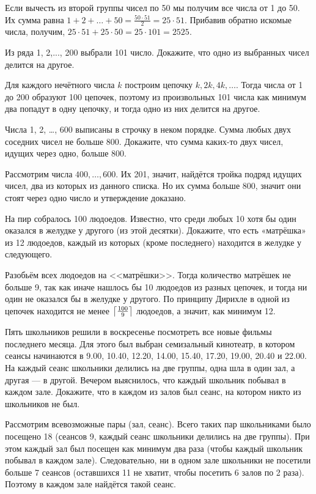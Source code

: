 \documentclass[12pt,a4paper]{article}
\begin{document}
 Если вычесть из второй группы чисел по 50 мы получим все числа от 1 до 50. Их сумма равна $1+2+\ldots+50=\frac{50\cdot 51}{2} = 25 \cdot 51$. Прибавив обратно искомые числа, получим, $25 \cdot 51+ 25\cdot 50 = 25 \cdot 101 = 2525$.


  Из ряда 1, 2,..., 200 выбрали 101 число. Докажите, что одно из выбранных чисел делится на другое.

 Для каждого нечётного числа $k$ построим цепочку $k, 2k, 4k, \ldots$. Тогда числа от 1 до 200 образуют 100 цепочек, поэтому из произвольных 101 числа как минимум два попадут в одну цепочку, и тогда одно из них делится на другое.

  Числа 1, 2, \ldots, 600 выписаны в строчку в неком порядке. Сумма любых двух соседних чисел не больше 800. Докажите, что сумма каких-то двух чисел, идущих через одно, больше 800.

 Рассмотрим числа $400, \ldots,600$. Их 201, значит, найдётся тройка подряд идущих чисел, два из которых из данного списка. Но их сумма больше 800, значит они стоят через одно число и утверждение доказано.


 На пир собралось 100 людоедов. Известно, что среди любых 10 хотя бы один оказался в желудке у другого (из этой десятки). Докажите, что есть «матрёшка» из 12 людоедов, каждый из которых (кроме последнего) находится в желудке у следующего.

 Разобьём всех людоедов на <<матрёшки>>. Тогда количество матрёшек не больше 9, так как иначе нашлось бы 10 людоедов из разных цепочек, и тогда ни один не оказался бы в желудке у другого. По принципу Дирихле в одной из цепочек находится не менее $\left\lceil\frac{100}{9}\right\rceil$ людоедов, а значит, как минимум 12.

 Пять школьников решили в воскресенье посмотреть все новые фильмы последнего месяца. Для этого был выбран семизальный кинотеатр, в котором сеансы начинаются в 9.00, 10.40, 12.20, 14.00, 15.40, 17.20, 19.00, 20.40 и 22.00. На каждый сеанс школьники делились на две группы, одна шла в один зал, а другая --- в другой. Вечером выяснилось, что каждый школьник побывал в каждом зале. Докажите, что в каждом из залов был сеанс, на котором никто из школьников не был.

 Рассмотрим всевозможные пары (зал, сеанс). Всего таких пар школьниками было посещено 18 (сеансов 9, каждый сеанс школьники делились на две группы).  При этом каждый зал был посещен как минимум два раза (чтобы каждый школьник побывал в каждом зале). Следовательно, ни в одном зале школьники не посетили больше 7 сеансов (оставшихся 11 не хватит, чтобы посетить 6 залов по 2 раза). Поэтому в каждом зале найдётся такой сеанс.
\end{document}
